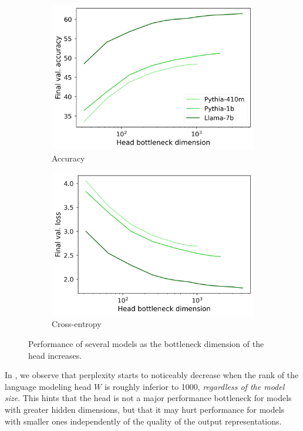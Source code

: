 \begin{figure}[ht]
\centering
    \begin{subfigure}{0.41\columnwidth}
         \includegraphics[width=\linewidth]{sources/part_1/softmax_bottleneck/imgs/llama_bottleneck_acc.png}
         \caption{Accuracy}
         \label{fig:bottleneck_acc}
    \end{subfigure}
    \begin{subfigure}{0.42\columnwidth}
         \includegraphics[width=\linewidth]{sources/part_1/softmax_bottleneck/imgs/llama_bottleneck_loss.png}
         \caption{Cross-entropy}
         \label{fig:bottleneck_ce}
    \end{subfigure}
    \caption{Performance of several models as the bottleneck dimension of the head increases.}
    \label{fig:perf_bottleneck}
\end{figure}
In , we observe that perplexity starts to noticeably decrease when the rank of the language modeling head $W$ is roughly inferior to 1000, \textit{regardless of the model size}. This hints that the head is not a major performance bottleneck for models with greater hidden dimensions, but that it may hurt performance for models with smaller ones independently of the quality of the output representations.

